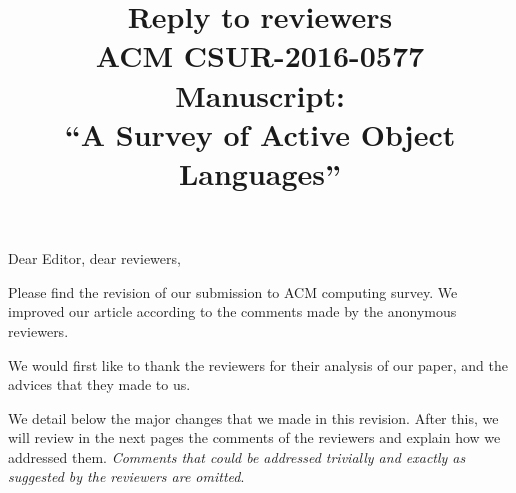 \documentclass{article}
\title{Reply to reviewers\\
ACM CSUR-2016-0577 Manuscript: \\``A Survey of Active Object Languages'' }
\begin{document}
\maketitle
\noindent
Dear Editor, dear reviewers,

Please find the revision of our submission to ACM computing survey. We improved our 
article according to the  comments made by the 
anonymous reviewers.

We would first like to thank the reviewers for their analysis of our paper, and the 
advices that they made to us.

We detail below the major changes that we made in this revision. After this, we will 
review in the next pages the comments of the reviewers and explain how we addressed them. 
\emph{Comments that could be addressed trivially and exactly as suggested by the 
reviewers are omitted}.
\bigskip
\end{document}
